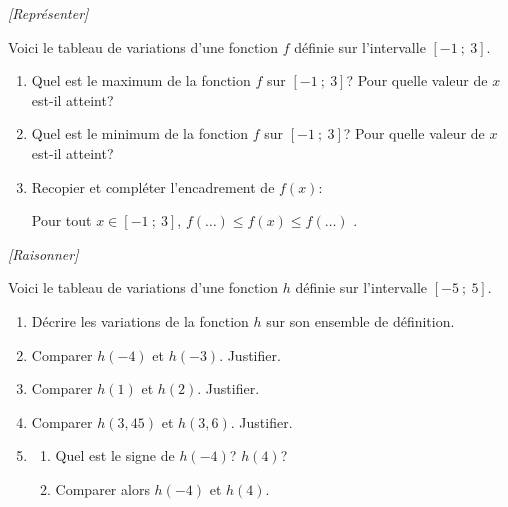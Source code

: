 \exo \textit{[Représenter]}

Voici le tableau de variations d'une fonction $f$ définie sur l'intervalle $[-1~;~3]$.

\begin{center}
\end{center}

\begin{enumerate}
\item Quel est le maximum de la fonction $f$ sur $[-1~;~3]$? Pour quelle valeur de $x$ est-il atteint?
\item Quel est le minimum de la fonction $f$ sur $[-1~;~3]$? Pour quelle valeur de $x$ est-il atteint?
\item Recopier et compléter l'encadrement de $f(x)$:

\og Pour tout $x \in [-1~;~3]$, $f(\ldots)\leqslant f(x) \leqslant f(\ldots)$ \fg{}. 
\end{enumerate}

\exo \textit{[Raisonner]}

\smallskip

Voici le tableau de variations d'une fonction $h$ définie sur l'intervalle $[-5~;~5]$.

\begin{center}
\end{center}

\smallskip

\begin{enumerate}
\item Décrire les variations de la fonction $h$ sur son ensemble de définition.
\item Comparer $h(-4)$ et $h(-3)$.  Justifier.
\item Comparer $h(1)$ et $h(2)$.  Justifier.
\item Comparer $h(3,45)$ et $h(3,6)$.  Justifier.
\item \begin{enumerate}[label=\alph*)]
\item Quel est le signe de $h(-4)$? $h(4)$?
\item Comparer alors $h(-4)$ et $h(4)$.
\end{enumerate}
\end{enumerate}

